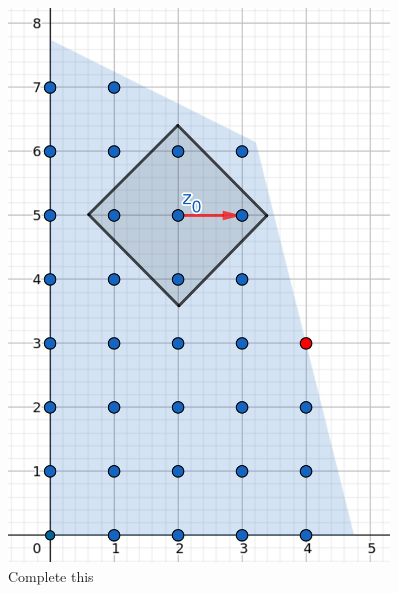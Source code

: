 \begin{figure}[h]
\centering
\begin{minipage}[b]{0.45\textwidth}
    \centering
    \includegraphics[width=0.9\textwidth]{images/IP(6).png}
    \caption{Complete this}
\end{minipage}
\hfill
\begin{minipage}[b]{0.45\textwidth}
    \centering

\end{minipage}
\end{figure}
